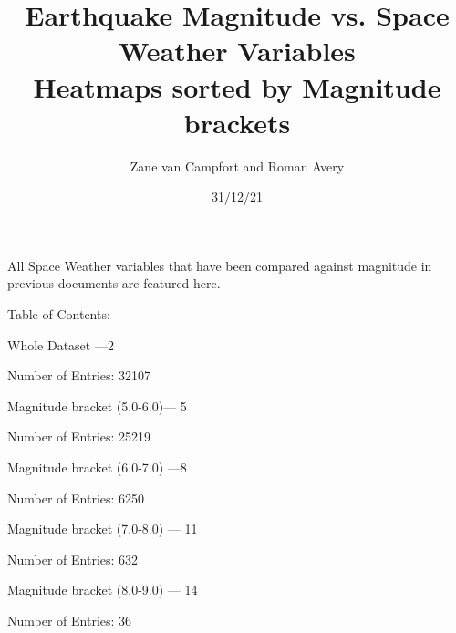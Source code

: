 \documentclass[12pt]{article}
\title{Earthquake Magnitude vs. Space Weather Variables\\
\large Heatmaps sorted by Magnitude brackets}
\author{Zane van Campfort and Roman Avery}
\date{31/12/21}
\begin{document}
\maketitle
\begin{large}
All Space Weather variables that have been compared against magnitude in
previous documents are featured here.\newline


\centering Table of Contents:

\begin{description}
  \item Whole Dataset ---\null\hfill 2
\item Number of Entries: 32107
  \item Magnitude bracket (5.0-6.0)--- \null\hfill 5
\item Number of Entries: 25219
  \item Magnitude bracket (6.0-7.0) ---\null\hfill 8
\item Number of Entries: 6250
  \item Magnitude bracket (7.0-8.0) --- \null\hfill 11
\item Number of Entries: 632
  \item Magnitude bracket (8.0-9.0) --- \null\hfill 14
\item Number of Entries: 36
\end{description}
\end{large}

\graphicspath{{../plots/31_12/}}

\newpage
\end{document}
